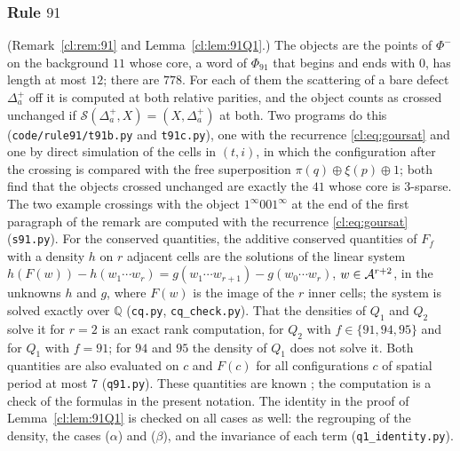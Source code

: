 \subsubsection{Rule $91$}\label{app:91} (Remark~\ref{cl:rem:91} and Lemma~\ref{cl:lem:91Q1}.) The objects are the points of $\Phi^-$ on the background $11$ whose core, a word of $\Phi_{91}$ that begins and ends with $0$, has length at most $12$; there are $778$. For each of them the scattering of a bare defect $\Delta^+_a$ off it is computed at both relative parities, and the object counts as crossed unchanged if $\mathcal S(\Delta^+_a,X)=(X,\Delta^+_a)$ at both. Two programs do this (\texttt{code/rule91/t91b.py} and \texttt{t91c.py}), one with the recurrence \eqref{cl:eq:goursat} and one by direct simulation of the cells in $(t,i)$, in which the configuration after the crossing is compared with the free superposition $\pi(q)\oplus\xi(p)\oplus1$; both find that the objects crossed unchanged are exactly the $41$ whose core is $3$-sparse. The two example crossings with the object $1^\infty001^\infty$ at the end of the first paragraph of the remark are computed with the recurrence \eqref{cl:eq:goursat} (\texttt{s91.py}). For the conserved quantities, the additive conserved quantities of $F_f$ with a density $h$ on $r$ adjacent cells are the solutions of the linear system $h(F(w))-h(w_1\cdots w_r)=g(w_1\cdots w_{r+1})-g(w_0\cdots w_r)$, $w\in\mathcal{A}^{r+2}$, in the unknowns $h$ and $g$, where $F(w)$ is the image of the $r$ inner cells; the system is solved exactly over $\mathbb Q$ (\texttt{cq.py}, \texttt{cq\_check.py}). That the densities of $Q_1$ and $Q_2$ solve it for $r=2$ is an exact rank computation, for $Q_2$ with $f\in\{91,94,95\}$ and for $Q_1$ with $f=91$; for $94$ and $95$ the density of $Q_1$ does not solve it. Both quantities are also evaluated on $c$ and $F(c)$ for all configurations $c$ of spatial period at most $7$ (\texttt{q91.py}). These quantities are known \cite{Takesue1995,Takesue1997}; the computation is a check of the formulas in the present notation. The identity in the proof of Lemma~\ref{cl:lem:91Q1} is checked on all cases as well: the regrouping of the density, the cases ($\alpha$) and ($\beta$), and the invariance of each term (\texttt{q1\_identity.py}).

